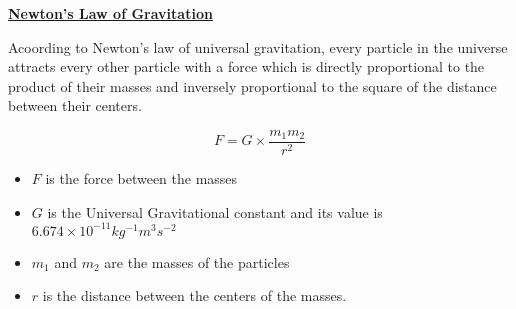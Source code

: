 \begin{center}
\Large{\textbf{\underline{Newton's Law of Gravitation}}}
\end{center}
\begin{justify}
Acoording to Newton's law of universal gravitation, every particle in the universe attracts every other particle with a force which is directly proportional to the product of their masses and inversely proportional to the square of the distance between their centers.
\end{justify}
\begin{equation}
F = G \times \frac{m_1 m_2}{r^2}  
\end{equation}
\begin{itemize}
  \item $F$ is the force between the masses
  \item $G$ is the Universal Gravitational constant and its value is $6.674 \times 10 ^{-11}  kg^{-1}m^{3}s^{-2}$
  \item $m_1$ and $m_2$ are the masses of the particles
  \item $r$ is the distance between the centers of the masses.
\end{itemize}


